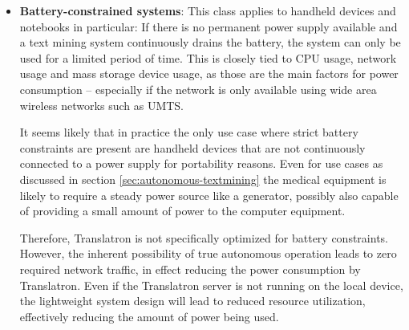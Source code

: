 \documentclass[a4paper, 12pt, twoside, reqn]{report}
\numberwithin{figure}{chapter}
\newtheorem[L]{boxedDefinition}{Definition}
\newtheorem[L]{boxedExample}{Example}
\begin{document}
\begin{itemize}
  Although no authoritative tests have been performed, it is expected that internal network performance is a critical factor for clustered systems like Excerbt. Even more important to the end user is the network connection from the device displaying the user interface to the server instance: A high latency in this path will degrade the performance perceived by the user as the communication poses the bottleneck for viewing search results. While this is generally not a critical issue for local network connections, users in rural areas in foreign countries accessing servers available on the internet will not only experience a slow connection but will also have to deal with connection errors. A comparable use case is discussed in section \ref{sec:autonomous-textmining}.
  
  Translatron has not been particularly optimized for minimum network utilization -- not because network-constrained systems are considered an irrelevant use case, but because the core system design of Translatron completely works around this class of constraints by allowing true offline usage, thereby eliminating network access altogether during normal operation\footnote{Depending on data availability, the input data might need to be downloaded from the internet.}.
  
  \item \textbf{Battery-constrained systems}: This class applies to handheld devices and notebooks in particular: If there is no permanent power supply available and a text mining system continuously drains the battery, the system can only be used for a limited period of time. This is closely tied to CPU usage, network usage and mass storage device usage, as those are the main factors for power consumption -- especially if the network is only available using wide area wireless networks such as UMTS.
  
  It seems likely that in practice the only use case where strict battery constraints are present are handheld devices that are not continuously connected to a power supply for portability reasons. Even for use cases as discussed in section \ref{sec:autonomous-textmining} the medical equipment is likely to require a steady power source like a generator, possibly also capable of providing a small amount of power to the computer equipment.
  
  Therefore, Translatron is not specifically optimized for battery constraints. However, the inherent possibility of true autonomous operation leads to zero required network traffic, in effect reducing the power consumption by Translatron. Even if the Translatron server is not running on the local device, the lightweight system design will lead to reduced resource utilization, effectively reducing the amount of power being used.
\end{itemize}
  
\end{document}

